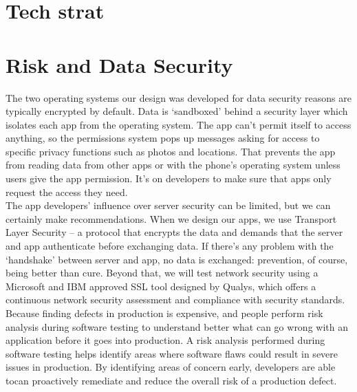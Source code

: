 \section{Tech strat}

 \section{Risk and Data Security}
The two operating systems our design was developed for data security reasons are typically encrypted by default. Data is ‘sandboxed’ behind a security layer which isolates each app from the operating system. The app can’t permit itself to access anything, so the permissions system pops up messages asking for access to specific privacy functions such as photos and locations. That prevents the app from reading data from other apps or with the phone’s operating system unless users give the app permission. It’s on developers to make sure that apps only request the access they need.
 \\The app developers’ influence over server security can be limited, but we can certainly make recommendations. When we design our apps, we use Transport Layer Security – a protocol that encrypts the data and demands that the server and app authenticate before exchanging data. If there’s any problem with the ‘handshake’ between server and app, no data is exchanged: prevention, of course, being better than cure. Beyond that, we will test network security using a Microsoft and IBM approved SSL tool designed by Qualys, which offers a continuous network security assessment and compliance with security standards.
 \\Because finding defects in production is expensive, and people perform risk analysis during software testing to understand better what can go wrong with an application before it goes into production. A risk analysis performed during software testing helps identify areas where software flaws could result in severe issues in production. By identifying areas of concern early, developers are able tocan proactively remediate and reduce the overall risk of a production defect.

